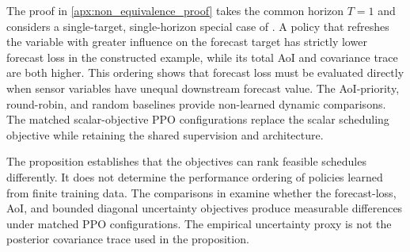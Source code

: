 The proof in \ref{apx:non_equivalence_proof} takes the common horizon $T=1$
and considers a single-target, single-horizon special case of
. A policy that refreshes the variable with greater
influence on the forecast target has strictly lower forecast loss in the
constructed example, while its total AoI and covariance trace are both higher.
This ordering shows that forecast loss must be evaluated directly when sensor
variables have unequal downstream forecast value.
The AoI-priority, round-robin, and random baselines provide non-learned dynamic
comparisons. The matched scalar-objective PPO configurations replace the scalar
scheduling objective while retaining the shared supervision and architecture.

The proposition establishes that the objectives can rank feasible schedules
differently. It does not determine the performance ordering of policies learned
from finite training data. The comparisons in
 examine whether the
forecast-loss, AoI, and bounded diagonal uncertainty objectives produce
measurable differences under matched PPO configurations. The empirical uncertainty proxy is not the
posterior covariance trace used in the proposition.
